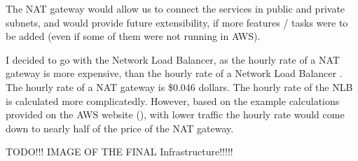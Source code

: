 		The NAT gateway would allow us to connect the services in public and private subnets, and would provide future extensibility, if more 
		features / tasks were to be added (even if some of them were not running in AWS).

		I decided to go with the Network Load Balancer, as the hourly rate of a NAT gateway is more expensive, than the hourly rate of a 
		Network Load Balancer \cite{natprice} \cite{nlbprice}. The hourly rate of a NAT gateway is \$0.046 dollars. The hourly rate of 
		the NLB is calculated more complicatedly. However, based on the example calculations provided on the AWS website (\cite{nlbprice}),
		with lower traffic the hourly rate would come down to nearly half of the price of the NAT gateway.

		TODO!!! IMAGE OF THE FINAL Infrastructure!!!!!
